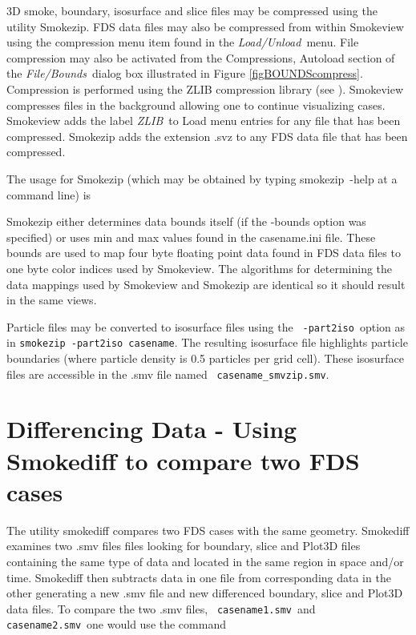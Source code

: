 \documentclass[11pt,twoside]{book}
\begin{document}
3D smoke, boundary, isosurface and slice files may be compressed
using the utility Smokezip.  FDS data files may also be compressed
from within Smokeview using the compression menu item found in the
{\em Load/Unload}\ menu.  File compression may also be activated
from the Compressions, Autoload section of the {\em File/Bounds}\
dialog box illustrated in Figure \ref{figBOUNDScompress}.
Compression is performed using the ZLIB compression library (see
\hhref{http://www.zlib.org}). Smokeview compresses files in the
background allowing one to continue visualizing cases.  Smokeview
adds the label {\em ZLIB}\ to Load menu entries for any file that
has been compressed. Smokezip adds the extension .svz to any FDS
data file that has been compressed.

The usage for Smokezip (which may be obtained by typing smokezip~-help at a command line) is



Smokezip either determines data bounds itself (if the -bounds option was specified)
or uses min and max values found in the casename.ini
file.  These bounds are used to map four byte floating point data
found in FDS data files to one byte color indices used by
Smokeview.  The algorithms for determining
the data mappings used by Smokeview and Smokezip are identical so it
should result in the same views.

Particle files may be converted to isosurface files using the {\tt
-part2iso}\ option as in {\tt smokezip -part2iso casename}.  The
resulting isosurface file highlights particle boundaries (where
particle density is 0.5 particles per grid cell). These isosurface
files are accessible in the .smv file named {\tt
casename\_smvzip.smv}.

\section{Differencing Data - Using Smokediff to compare two FDS cases}

The utility smokediff compares two FDS cases with the same
geometry.  Smokediff examines two .smv files files looking for
boundary, slice and Plot3D files containing the same type of data
and located in the same region in space and/or time. Smokediff
then subtracts data in one file from corresponding data in the
other generating a new .smv file and new differenced boundary,
slice and Plot3D data files. To compare the two .smv files, {\tt
casename1.smv}\ and {\tt casename2.smv}\ one would use the command
\end{document}
